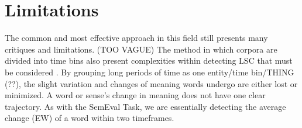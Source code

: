 \section{Limitations}

The common and most effective approach in this field still presents many critiques and limitations. (TOO VAGUE) The method in which corpora are divided into time bins also present complexities within detecting LSC that must be considered \citep{hengchen2021challenges}. By grouping long periods of time as one entity/time bin/THING (??), the slight variation and changes of meaning words undergo are either lost or minimized. A word or sense’s change in meaning does not have one clear trajectory. As with the SemEval Task, we are essentially detecting the average change (EW) of a word within two timeframes. 